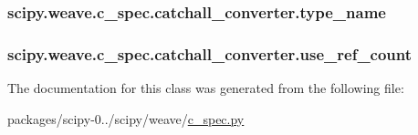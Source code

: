 \subsubsection[{type\+\_\+name}]{\setlength{\rightskip}{0pt plus 5cm}scipy.\+weave.\+c\+\_\+spec.\+catchall\+\_\+converter.\+type\+\_\+name}\label{classscipy_1_1weave_1_1c__spec_1_1catchall__converter_ab00344b671e945ba61c1f9f7310f442f}
\hypertarget{classscipy_1_1weave_1_1c__spec_1_1catchall__converter_a47df5ce445ce176c1b026aeedb07bd30}{}
\subsubsection[{use\+\_\+ref\+\_\+count}]{\setlength{\rightskip}{0pt plus 5cm}scipy.\+weave.\+c\+\_\+spec.\+catchall\+\_\+converter.\+use\+\_\+ref\+\_\+count}\label{classscipy_1_1weave_1_1c__spec_1_1catchall__converter_a47df5ce445ce176c1b026aeedb07bd30}


The documentation for this class was generated from the following file\+:\begin{DoxyCompactItemize}
\item 
packages/scipy-\/0../scipy/weave/\hyperlink{c__spec_8py}{c\+\_\+spec.\+py}\end{DoxyCompactItemize}

